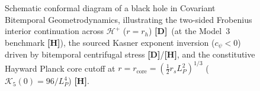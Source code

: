 \documentclass[11pt,a4paper]{article}
\newcommand{\catD}{\textbf{\textcolor{blue!75!black}{[D]}}}
\newcommand{\catH}{\textbf{\textcolor{orange!85!black}{[H]}}}
\theoremstyle{plain}
\theoremstyle{definition}
\theoremstyle{remark}
\numberwithin{equation}{section}
\begin{document}
\begin{figure}[H]
\caption{Schematic conformal diagram of a black hole in Covariant Bitemporal Geometrodynamics, illustrating the two-sided Frobenius interior continuation across $\mathcal{H}^+$ ($r = r_h$) \catD\ (at the Model~3 benchmark \catH), the sourced Kasner exponent inversion ($c_{\psi} < 0$) driven by bitemporal centrifugal stress \catD/\catH, and the constitutive Hayward Planck core cutoff at $r = r_{\text{core}} = (\frac{1}{2}r_s L_P^2)^{1/3}$ ($\mathcal{K}_5(0) = 96/L_P^4$) \catH.}
\label{fig:penrose_cbg}
\end{figure}
\end{document}
